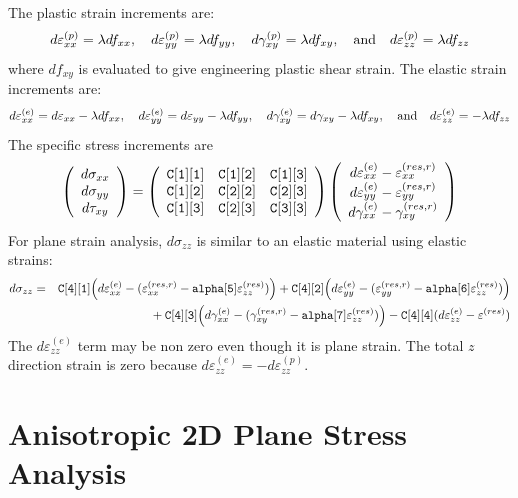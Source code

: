 \documentclass[11pt]{book}
\def\code#1{{\small\tt #1}}
\def\e#1{\varepsilon_{#1}}
\def\er#1{\varepsilon_{#1}^{(res)}}
\def\err#1{\varepsilon_{#1}^{(res,r)}}
\def\g#1{\gamma_{#1}}
\def\s#1{\sigma_{#1}}
\def\t#1{\tau_{#1}}
\def\vvec#1#2#3{\left(\begin{array}{ccc} #1 \\ #2 \\ #3 \end{array}\right)}
\begin{document}
 The plastic strain increments are:
\begin{equation}
       d\varepsilon_{xx}^{(p)} = \lambda df_{xx}, \quad
       d\varepsilon_{yy}^{(p)} = \lambda df_{yy}, \quad
       d\gamma_{xy}^{(p)} =  \lambda df_{xy}, \quad  {\rm and} \quad
       d\varepsilon_{zz}^{(p)} = \lambda df_{zz}
\end{equation}
where $df_{xy}$ is evaluated to give engineering plastic shear strain. The elastic strain increments are:
\begin{equation}
       d\varepsilon_{xx}^{(e)} = d\varepsilon_{xx} -\lambda df_{xx}, \quad
       d\varepsilon_{yy}^{(e)} = d\varepsilon_{yy} -\lambda df_{yy}, \quad
       d\gamma_{xy}^{(e)} = d\gamma_{xy} -  \lambda df_{xy}, \quad  {\rm and} \quad
       d\varepsilon_{zz}^{(e)} =  -\lambda df_{zz}
\end{equation}
The specific stress increments are
\begin{equation}
      \vvec{d\s{xx}}{d\s{yy}}{d\t{xy}} = \left(\begin{array}{ccc}
      		\code{C[1][1]} & \code{C[1][2]} & \code{C[1][3]}  \\
      		\code{C[1][2]} & \code{C[2][2]} & \code{C[2][3]}  \\
      		\code{C[1][3]} & \code{C[2][3]} & \code{C[3][3]} 
           \end{array}\right)
          \vvec{d\varepsilon_{xx}^{(e)}  - \err{xx}}{d\varepsilon_{yy}^{(e)}  -\err{yy}}{d\g{xx}^{(e)}-\gamma_{xy}^{(res,r)}}
 \end{equation}
For plane strain analysis, $d\sigma_{zz}$ is similar to an elastic material using elastic strains:
 \begin{eqnarray}
     d\s{zz} & = & \code{C[4][1]} \Bigl(d\e{xx}^{(e)} -(\err{xx}-\code{alpha[5]}\er{zz})\Bigr)
                         +  \code{C[4][2]}\Bigl(d\e{yy}^{(e)} -(\err{yy}-\code{alpha[6]}\er{zz})\Bigr) 
     \nonumber \\
     && \qquad\qquad\mbox{}
                 + \code{C[4][3]}\Bigl(d\g{xx}^{(e)}-(\gamma_{xy}^{(res,r)}-\code{alpha[7]}\er{zz})\Bigr)  - \code{C[4][4]}(d\e{zz}^{(e)}-\er{})
\end{eqnarray}
The $d\e{zz}^{(e)}$ term may be non zero even though it is plane strain. The total $z$ direction strain is zero because $d\e{zz}^{(e)} = -d\e{zz}^{(p)}$.

\section{Anisotropic 2D Plane Stress Analysis}
\end{document}
